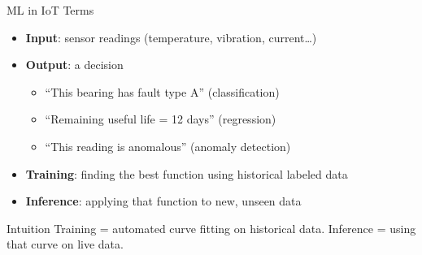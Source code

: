 \documentclass[aspectratio=169,11pt]{beamer}
\begin{document}
\begin{frame}{ML in IoT Terms}
    \begin{itemize}
        \item \textbf{Input}: sensor readings (temperature, vibration, current\ldots)
        \item \textbf{Output}: a decision
        \begin{itemize}
            \item ``This bearing has fault type A'' (classification)
            \item ``Remaining useful life = 12 days'' (regression)
            \item ``This reading is anomalous'' (anomaly detection)
        \end{itemize}
        \item \textbf{Training}: finding the best function using historical labeled data
        \item \textbf{Inference}: applying that function to new, unseen data
    \end{itemize}

    \vspace{0.3cm}
    \begin{block}{Intuition}
        Training = automated curve fitting on historical data. Inference = using that curve on live data.
    \end{block}
\end{frame}
\end{document}
